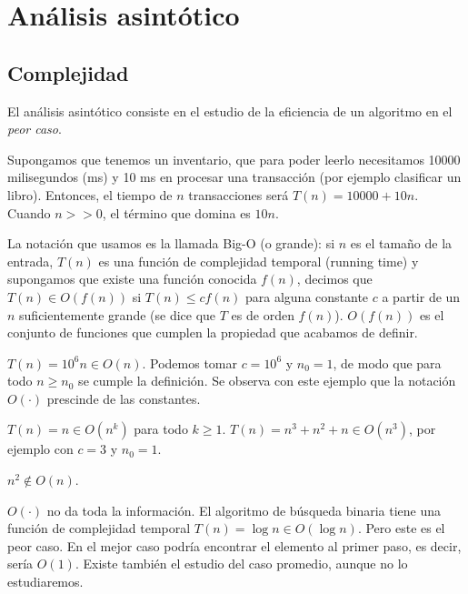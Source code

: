 \documentclass[AL.tex]{subfiles}
\begin{document}

\chapter{Análisis asintótico}

\section{Complejidad}

El análisis asintótico consiste en el estudio de la eficiencia de un algoritmo en el \emph{peor caso}. 

\begin{ej}
Supongamos que tenemos un inventario, que para poder leerlo necesitamos 10000 milisegundos (ms) y 10 ms en procesar una transacción (por ejemplo clasificar un libro). Entonces, el tiempo de $n$ transacciones será $T(n)=10000+10n$. Cuando $n>>0$, el término que domina es $10n$. 
\end{ej}

La notación que usamos es la llamada Big-O (o grande): si $n$ es el tamaño de la entrada, $T(n)$ es una función de complejidad temporal (running time) y supongamos que existe una función conocida $f(n)$, decimos que $T(n)\in O(f(n))$ si $T(n)\leq c f(n)$ para alguna constante $c$ a partir de un $n$ suficientemente grande (se dice que $T$ es de orden $f(n)$). $O(f(n))$ es el conjunto de funciones que cumplen la propiedad que acabamos de definir.

\begin{ej}
$T(n)=10^6n\in O(n)$. Podemos tomar $c=10^6$ y $n_0=1$, de modo que para todo $n\geq n_0$ se cumple la definición. Se observa con este ejemplo que la notación $O(\cdot)$ prescinde de las constantes.
\end{ej}
\begin{ej}
$T(n)=n\in O(n^k)$ para todo $k\geq 1$. $T(n)=n^3+n^2+n\in O(n^3)$, por ejemplo con $c=3$ y $n_0=1$.
\end{ej}

\begin{ej}
$n^2\notin O(n)$. 
\end{ej}

\begin{ej}
$O(\cdot)$ no da toda la información. El algoritmo de búsqueda binaria tiene una función de complejidad temporal $T(n)=\log n\in O(\log n)$. Pero este es el peor caso. En el mejor caso podría encontrar el elemento al primer paso, es decir, sería $O(1)$. Existe también el estudio del caso promedio, aunque no lo estudiaremos. 
\end{ej}
\end{document}
